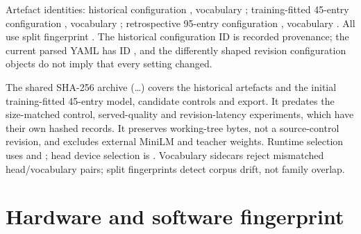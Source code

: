Artefact identities: historical configuration , vocabulary ; training-fitted 45-entry configuration , vocabulary ; retrospective 95-entry configuration , vocabulary . All use split fingerprint . The historical configuration ID is recorded provenance; the current parsed YAML has ID , and the differently shaped revision configuration objects do not imply that every setting changed. %

The shared SHA-256 archive (\ldots) covers the historical artefacts and the initial training-fitted 45-entry model, candidate controls and export. It predates the size-matched control, served-quality and revision-latency experiments, which have their own hashed records. It preserves working-tree bytes, not a source-control revision, and excludes external MiniLM and teacher weights. %
Runtime selection uses  and ; head device selection is . Vocabulary sidecars reject mismatched head/vocabulary pairs; split fingerprints detect corpus drift, not family overlap.

\section{Hardware and software fingerprint}\label{app:hw}


